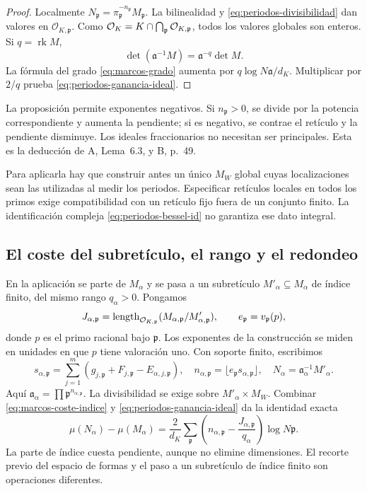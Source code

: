 \begin{proof}
Localmente $N_\mathfrak p=\pi_\mathfrak p^{-n_\mathfrak p}
M_\mathfrak p$. La bilinealidad y
\eqref{eq:periodos-divisibilidad} dan valores en
$\mathcal O_{K,\mathfrak p}$. Como
$\mathcal{O}_K=K\cap\bigcap_\mathfrak p\mathcal O_{K,\mathfrak p}$,
todos los valores globales son enteros. Si $q=\operatorname{rk}M$,
\[
 \det(\mathfrak a^{-1}M)=\mathfrak a^{-q}\det M.
\]
La fórmula del grado \eqref{eq:marcos-grado} aumenta por
$q\log N\mathfrak a/d_K$. Multiplicar por $2/q$ prueba
\eqref{eq:periodos-ganancia-ideal}.
\end{proof}

La proposición permite exponentes negativos. Si $n_\mathfrak p>0$,
se divide por la potencia correspondiente y aumenta la pendiente;
si es negativo, se contrae el retículo y la pendiente disminuye.
Los ideales fraccionarios no necesitan ser principales.
Esta es la deducción de A, Lema~6.3, y B, p.~49.

Para aplicarla hay que construir antes un único $M_W$ global cuyas
localizaciones sean las utilizadas al medir los periodos. Especificar
retículos locales en todos los primos exige compatibilidad con un
retículo fijo fuera de un conjunto finito. La identificación compleja
\eqref{eq:periodos-bessel-id} no garantiza ese dato integral.

\subsection{El coste del subretículo, el rango y el redondeo}

En la aplicación se parte de $M_\alpha$ y se pasa a un subretículo
$M'_\alpha\subseteq M_\alpha$ de índice finito, del mismo rango
$q_\alpha>0$. Pongamos
\[
 J_{\alpha,\mathfrak p}=\operatorname{length}_{\mathcal O_{K,\mathfrak p}}
       (M_{\alpha,\mathfrak p}/M'_{\alpha,\mathfrak p}),
 \qquad e_\mathfrak p=v_\mathfrak p(p),
\]
donde $p$ es el primo racional bajo $\mathfrak p$. Los exponentes
de la construcción se miden en unidades en que $p$ tiene valoración
uno. Con soporte finito, escribimos
\begin{equation}
 s_{\alpha,\mathfrak p}=\sum_{j=1}^m
     (g_{j,\mathfrak p}+F_{j,\mathfrak p}-E_{\alpha,j,\mathfrak p}),
 \quad n_{\alpha,\mathfrak p}=\lfloor e_\mathfrak p
                                      s_{\alpha,\mathfrak p}\rfloor,
 \quad N_\alpha=\mathfrak a_\alpha^{-1}M'_\alpha.
 \label{eq:periodos-ideal-columna}
\end{equation}
Aquí $\mathfrak a_\alpha=\prod\mathfrak p^{n_{\alpha,\mathfrak p}}$.
La divisibilidad se exige sobre $M'_\alpha\times M_W$.
Combinar \eqref{eq:marcos-coste-indice} y
\eqref{eq:periodos-ganancia-ideal} da la identidad exacta
\begin{equation}
 \mu(N_\alpha)-\mu(M_\alpha)
 =\frac2{d_K}\sum_\mathfrak p
       \left(n_{\alpha,\mathfrak p}
             -\frac{J_{\alpha,\mathfrak p}}{q_\alpha}\right)
                                       \log N\mathfrak p.
 \label{eq:periodos-cuenta-exacta}
\end{equation}
La parte de índice cuesta pendiente, aunque no elimine dimensiones.
El recorte previo del espacio de formas y el paso a un subretículo
de índice finito son operaciones diferentes.

